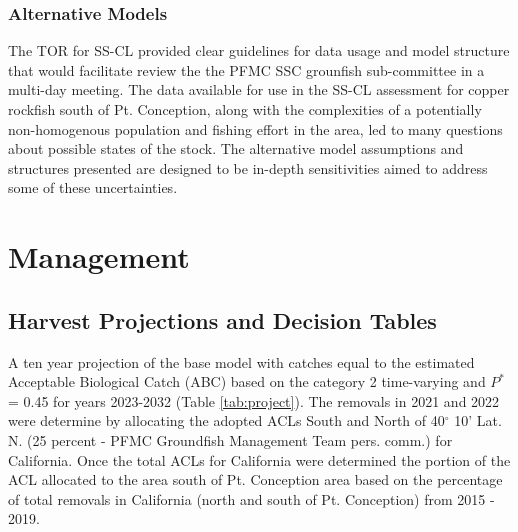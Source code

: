 \documentclass[11pt,
  english,
  a4paper,
]{article}
\begin{document}
\hypertarget{alternative-models}{%
\subsubsection{Alternative Models}\label{alternative-models}}

\leavevmode\tagmcend\tagstructend


The TOR for SS-CL provided clear guidelines for data usage and model structure that would facilitate review the the PFMC SSC grounfish sub-committee in a multi-day meeting. The data available for use in the SS-CL assessment for copper rockfish south of Pt. Conception, along with the complexities of a potentially non-homogenous population and fishing effort in the area, led to many questions about possible states of the stock. The alternative model assumptions and structures presented are designed to be in-depth sensitivities aimed to address some of these uncertainties.

\leavevmode\tagmcend\tagstructend\par


\hypertarget{management}{%
\section{Management}\label{management}}

\leavevmode\tagmcend\tagstructend


\hypertarget{harvest-projections-and-decision-tables}{%
\subsection{Harvest Projections and Decision Tables}\label{harvest-projections-and-decision-tables}}

\leavevmode\tagmcend\tagstructend


A ten year projection of the base model with catches equal to the estimated Acceptable Biological Catch (ABC) based on the category 2 time-varying and {\(P^*\)\leavevmode\tagmcend\tagstructend} = 0.45 for years 2023-2032 (Table \ref{tab:project}). The removals in 2021 and 2022 were determine by allocating the adopted ACLs South and North of 40{\(^\circ\)\leavevmode\tagmcend\tagstructend} 10' Lat. N. (25 percent - PFMC Groundfish Management Team pers. comm.) for California. Once the total ACLs for California were determined the portion of the ACL allocated to the area south of Pt. Conception area based on the percentage of total removals in California (north and south of Pt. Conception) from 2015 - 2019.
\end{document}
